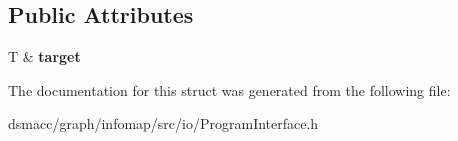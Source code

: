 \subsection*{Public Attributes}
\begin{DoxyCompactItemize}
\item 
\mbox{\label{structArgumentOption_abcda960c82b7ec7c79aee682b9739392}} 
T \& {\bfseries target}
\end{DoxyCompactItemize}


The documentation for this struct was generated from the following file\+:\begin{DoxyCompactItemize}
\item 
dsmacc/graph/infomap/src/io/Program\+Interface.\+h\end{DoxyCompactItemize}
